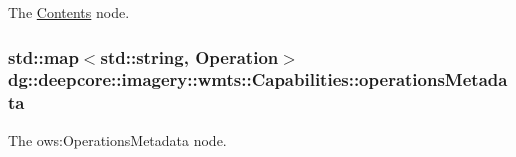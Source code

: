The \hyperlink{structdg_1_1deepcore_1_1imagery_1_1wmts_1_1_contents}{Contents} node. 

\subsubsection[{\texorpdfstring{operations\+Metadata}{operationsMetadata}}]{\setlength{\rightskip}{0pt plus 5cm}std\+::map$<$std\+::string, {\bf Operation}$>$ dg\+::deepcore\+::imagery\+::wmts\+::\+Capabilities\+::operations\+Metadata}\hypertarget{structdg_1_1deepcore_1_1imagery_1_1wmts_1_1_capabilities_a8f1483625c85a9ecebec0093ddfc6103}{}\label{structdg_1_1deepcore_1_1imagery_1_1wmts_1_1_capabilities_a8f1483625c85a9ecebec0093ddfc6103}


The ows\+:Operations\+Metadata node. 

